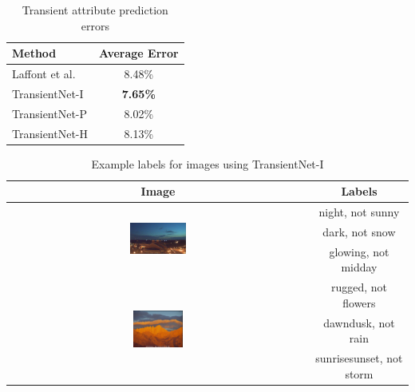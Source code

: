 \documentclass{article}
\begin{document}
\begin{table}[t]
	\centering
	\begin{tabular}{ | l | c | }
		\hline
			Method & Average Error \\ \hline \hline
			Laffont et al.~\cite{Laffont14}& 8.48\% \\ \hline
			TransientNet-I & \textbf{7.65\%} \\ \hline
			TransientNet-P & 8.02\% \\ \hline
			TransientNet-H & 8.13\% \\ 
		\hline
	\end{tabular}
	\caption{Transient attribute prediction errors}
	\label{tbl:transient}
\end{table}

\begin{table}[t!]
  \renewcommand{\arraystretch}{1.6}
  \centering
  \begin{tabular}[b]{| c | c |}
    \hline
    Image & Labels \\
    \hline \hline
    \multirow{3}[3]{*}[-2mm]{\includegraphics[width=0.19\textwidth]{figs/labels_1.jpg}}
      & night, not sunny \bigstrut \\
      & dark, not snow \bigstrut  \\
      & glowing, not midday \bigstrut  \\
    \hline
    \multirow{3}[3]{*}[-1mm]{\includegraphics[width=0.17\textwidth]{figs/labels_2.jpg}}
      & rugged, not flowers \bigstrut  \\
      & dawndusk, not rain \bigstrut  \\
      & sunrisesunset, not storm  \bigstrut \\
    \hline
  \end{tabular}
  \caption{Example labels for images using TransientNet-I}
  \label{tbl:labels}
\end{table}
\end{document}
